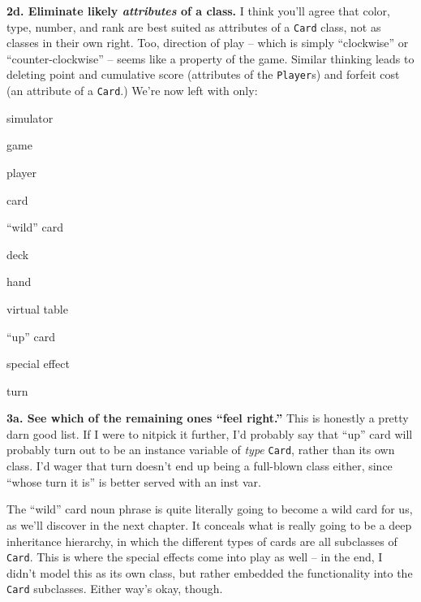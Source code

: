 \vspace{.1in}
\textbf{2d. Eliminate likely \textit{attributes} of a class.} I think you'll
agree that \textsf{color}, \textsf{type}, \textsf{number}, and \textsf{rank}
are best suited as attributes of a \texttt{Card} class, not as classes in
their own right. Too, \textsf{direction of play} -- which is simply
``clockwise'' or ``counter-clockwise'' -- seems like a property of the
\textsf{game}. Similar thinking leads to deleting \textsf{point} and
\textsf{cumulative score} (attributes of the \texttt{Player}s) and
\textsf{forfeit cost} (an attribute of a \texttt{Card}.) We're now left with
only:

\begin{samepage}
\begin{multicols}{3}
\small
\begin{compactitem}
\renewcommand\labelitemi{\raisebox{0.25ex}{\tiny$\bullet$}}
\item \textsf{simulator}
\item \textsf{game}
\item \textsf{player}
\item \textsf{card}
\columnbreak
\item \textsf{``wild'' card}
\item \textsf{deck}
\item \textsf{hand}
\item \textsf{virtual table}
\columnbreak
\item \textsf{``up'' card}
\item \textsf{special effect}
\item \textsf{turn}
\end{compactitem}
\end{multicols}
\end{samepage}


\textbf{3a. See which of the remaining ones ``feel right.''} This is honestly a
pretty darn good list. If I were to nitpick it further, I'd probably say that
\textsf{``up'' card} will probably turn out to be an instance variable of
\textit{type} \texttt{Card}, rather than its own class. I'd wager that
\textsf{turn} doesn't end up being a full-blown class either, since ``whose
turn it is'' is better served with an inst var.

The \textsf{``wild'' card} noun phrase is quite literally going to become a
wild card for us, as we'll discover in the next chapter. It conceals what is
really going to be a deep inheritance hierarchy, in which the different types
of cards are all subclasses of \texttt{Card}. This is where the
\textsf{special effect}s come into play as well -- in the end, I didn't model
this as its own class, but rather embedded the functionality into the
\texttt{Card} subclasses. Either way's okay, though.

